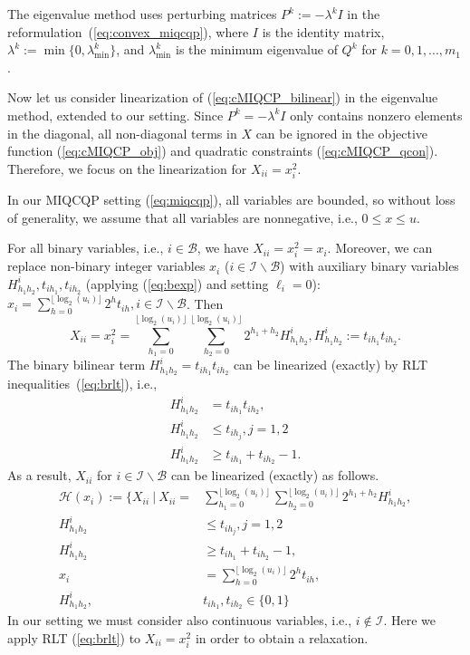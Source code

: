 \documentclass[]{article}
\begin{document}
The eigenvalue method \cite{hammer1970some} uses perturbing matrices $P^k := -\lambda^k I$ in the reformulation~(\ref{eq:convex_miqcqp}), where $I$ is the identity matrix, $\lambda^k := \min\{0, \lambda_{\min}^k\}$, and $\lambda_{\min}^k$ is the minimum eigenvalue of $Q^k$ for $k = 0,1,...,m_1$.

Now let us consider linearization of (\ref{eq:cMIQCP_bilinear}) in the eigenvalue method, extended to our setting. Since $P^k = -\lambda^k I$ only contains nonzero elements in the diagonal, all non-diagonal terms in $X$ can be ignored in the objective function (\ref{eq:cMIQCP_obj}) and quadratic constraints (\ref{eq:cMIQCP_qcon}). Therefore, we focus on the linearization for $X_{ii} = x_i^2$.

In our MIQCQP setting (\ref{eq:miqcqp}), all variables are bounded, so without loss of generality, we assume that all variables are nonnegative, i.e., $0\leq x\leq u$.

For all binary variables, i.e., $i\in\mathcal{B}$, we have $X_{ii} = x_i^2 = x_i$. Moreover, we can replace non-binary integer variables $x_i$ ($i\in\mathcal{I}\backslash\mathcal{B}$) with auxiliary binary variables $H_{h_1h_2}^i, t_{ih_1},t_{ih_2}$   (applying (\ref{eq:bexp}) and setting $\ell_i=0$): $x_i = \sum_{h=0}^{\lfloor \log_2(u_i)\rfloor}2^{h}t_{ih}, i\in \mathcal{I}\backslash\mathcal{B}$. Then
\[X_{ii} = x_i^2 = \sum_{h_1=0}^{\lfloor \log_2(u_i)\rfloor}\sum_{h_2=0}^{\lfloor \log_2(u_i)\rfloor}2^{h_1 + h_2}H_{h_1h_2}^i, H_{h_1h_2}^i := t_{ih_1}t_{ih_2}.\]
The binary bilinear term $H_{h_1h_2}^i = t_{ih_1}t_{ih_2}$ can be linearized (exactly) by RLT inequalities~(\ref{eq:brlt}), i.e.,
\begin{equation*}
    \begin{aligned}
        H_{h_1h_2}^i &= t_{ih_1}t_{ih_2},\\
        H_{h_1h_2}^i &\leq t_{ih_j}, j =1,2\\
        H_{h_1h_2}^i &\geq t_{ih_1} + t_{ih_2} - 1.
    \end{aligned}
\end{equation*}
As a result, $X_{ii}$ for $i\in\mathcal{I}\backslash \mathcal{B}$ can be linearized (exactly) as follows.
\begin{equation}
    \begin{aligned}
        \mathcal{H}(x_i):=\{X_{ii}\ |\ X_{ii} = &\sum_{h_1=0}^{\lfloor \log_2(u_i)\rfloor}\sum_{h_2=0}^{\lfloor \log_2(u_i)\rfloor}2^{h_1 + h_2}H_{h_1h_2}^{i},\\
        H_{h_1h_2}^i &\leq t_{ih_j}, j =1,2\\
        H_{h_1h_2}^i &\geq t_{ih_1} + t_{ih_2} - 1,\\
        x_i &= \sum_{h=0}^{\lfloor \log_2(u_i)\rfloor}2^{h}t_{ih},\\
        H_{h_1h_2}^i, &t_{ih_1},t_{ih_2}\in\{0,1\}
    \end{aligned}
\end{equation}
In our setting we must consider also continuous variables,  i.e., $i\notin\mathcal{I}$. Here we apply RLT (\ref{eq:brlt}) to $X_{ii} = x_{i}^2$ in order to obtain a relaxation. 
\end{document}
